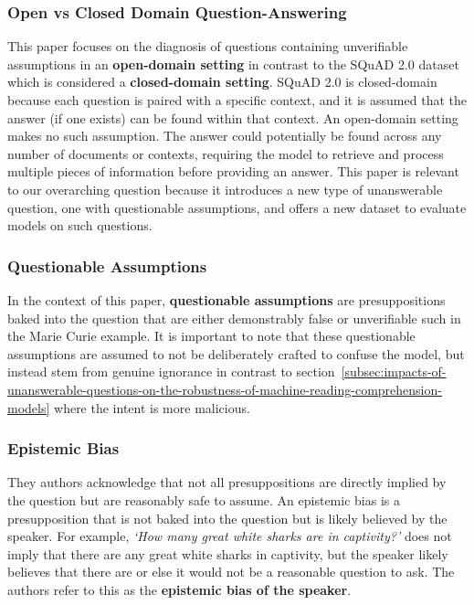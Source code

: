 \documentclass[letterpaper, 11pt]{article}
\begin{document}
\subsubsection{Open vs Closed Domain Question-Answering}
\label{sec:open-vs-closed-domain-question-answering}
This paper focuses on the diagnosis of questions containing unverifiable assumptions in an \textbf{open-domain setting} in contrast to the SQuAD 2.0 dataset which is considered a \textbf{closed-domain setting}. 
SQuAD 2.0 is closed-domain because each question is paired with a specific context, and it is assumed that the answer (if one exists) can be found within that context.
An open-domain setting makes no such assumption. The answer could potentially be found across any number of documents or contexts, requiring the model to retrieve and process 
multiple pieces of information before providing an answer. This paper is relevant to our overarching question because it introduces a new type of unanswerable question, one with questionable assumptions, and offers a new dataset to evaluate models on such questions.


\subsubsection{Questionable Assumptions}
In the context of this paper, \textbf{questionable assumptions} are presuppositions 
baked into the question that are either demonstrably false or unverifiable such in the Marie Curie example. It is important to note that these questionable assumptions are assumed to not be deliberately crafted to confuse the model,
but instead stem from genuine ignorance in contrast to section~\ref{subsec:impacts-of-unanswerable-questions-on-the-robustness-of-machine-reading-comprehension-models} where the intent is more malicious. 

\subsubsection{Epistemic Bias}
\label{sec:epistemic-bias}
They authors acknowledge that not all presuppositions are directly implied by the question but are reasonably safe to assume.
An epistemic bias is a presupposition that is not baked into the question but is likely believed by the speaker. For example, \textit{`How many great white sharks are in captivity?'} does not imply that there are any great white sharks in captivity, but the speaker likely believes that there are or 
else it would not be a reasonable question to ask.
The authors refer to this as the \textbf{epistemic bias of the speaker}.
\end{document}
